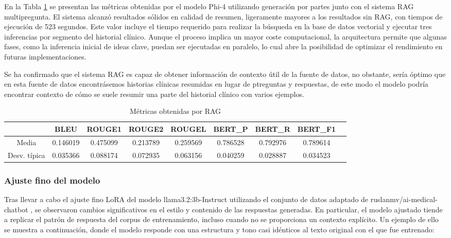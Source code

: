 \documentclass[../main.tex]{subfiles}
\begin{document}
En la Tabla \ref{tab:metricas_RAG} se presentan las métricas obtenidas por el modelo Phi-4 utilizando generación por partes junto con el sistema RAG multipregunta. El sistema alcanzó resultados sólidos en calidad de resumen, ligeramente mayores a los resultados sin RAG, con tiempos de ejecución de 523 segundos. Este valor incluye el tiempo requerido para realizar la búsqueda en la base de datos vectorial y ejecutar tres inferencias por segmento del historial clínico. Aunque el proceso implica un mayor coste computacional, la arquitectura permite que algunas fases, como la inferencia inicial de ideas clave, puedan ser ejecutadas en paralelo, lo cual abre la posibilidad de optimizar el rendimiento en futuras implementaciones.

Se ha confirmado que el sistema RAG es capaz de obtener información de contexto útil de la fuente de datos, no obstante, sería óptimo que en esta fuente de datos encontrásemos historias clínicas resumidas en lugar de ptreguntas y respuestas, de este modo el modelo podría encontrar contexto de cómo se suele resumir una parte del historial clínico con varios ejemplos.
\begin{table}[H]
	\centering
	\caption{Métricas obtenidas por RAG}
	\label{tab:metricas_RAG}
	\renewcommand{\arraystretch}{1.2}
	\begin{tabular}{c|cccccccc}
		\hline
		& \textbf{BLEU} & \textbf{ROUGE1} & \textbf{ROUGE2} & \textbf{ROUGEL} & \textbf{BERT\_P} & \textbf{BERT\_R} & \textbf{BERT\_F1} \\
		\hline
		Media & 0.146019 & 0.475099 & 0.213789 & 0.259569 & 0.786528 & 0.792976 & 0.789614 \\
		Desv. típica & 0.035366 & 0.088174 & 0.072935 & 0.063156 & 0.040259 & 0.028887 & 0.034523 \\
		\hline
	\end{tabular}
	
\end{table}
\subsubsection{Ajuste fino del modelo}
Tras llevar a cabo el ajuste fino LoRA del modelo llama3.2:3b-Instruct utilizando el conjunto de datos adaptado de ruslanmv/ai-medical-chatbot  \parencite{ruslanmv2024aimedchatbot}, se observaron cambios significativos en el estilo y contenido de las respuestas generadas. En particular, el modelo ajustado tiende a replicar el patrón de respuesta del corpus de entrenamiento, incluso cuando no se proporciona un contexto explícito. Un ejemplo de ello se muestra a continuación, donde el modelo responde con una estructura y tono casi idénticos al texto original con el que fue entrenado:
\end{document}
